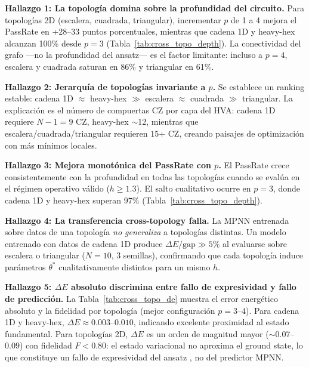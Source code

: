 \documentclass[11pt,a4paper,spanish]{book}
\begin{document}
\textbf{Hallazgo 1: La topología domina sobre la profundidad del circuito.} Para topologías 2D (escalera, cuadrada, triangular), incrementar $p$ de 1 a 4 mejora el PassRate en +28--33 puntos porcentuales, mientras que cadena 1D y heavy-hex alcanzan 100\% desde $p=3$ (Tabla~\ref{tab:cross_topo_depth}). La conectividad del grafo ---no la profundidad del ansatz--- es el factor limitante: incluso a $p=4$, escalera y cuadrada saturan en 86\% y triangular en 61\%.

\textbf{Hallazgo 2: Jerarquía de topologías invariante a $p$.} Se establece un ranking estable: cadena 1D $\approx$ heavy-hex $\gg$ escalera $\approx$ cuadrada $\gg$ triangular. La explicación es el número de compuertas CZ por capa del HVA: cadena 1D requiere $N-1 = 9$ CZ, heavy-hex $\sim$12, mientras que escalera/cuadrada/triangular requieren $15$+ CZ, creando paisajes de optimización con más mínimos locales.

\textbf{Hallazgo 3: Mejora monotónica del PassRate con $p$.} El PassRate crece consistentemente con la profundidad en todas las topologías cuando se evalúa en el régimen operativo válido ($h \geq 1.3$). El salto cualitativo ocurre en $p=3$, donde cadena 1D y heavy-hex superan 97\% (Tabla~\ref{tab:cross_topo_depth}).

\textbf{Hallazgo 4: La transferencia cross-topology falla.} La MPNN entrenada sobre datos de una topología \emph{no generaliza} a topologías distintas. Un modelo entrenado con datos de cadena 1D produce $\Delta E/\text{gap} \gg 5\%$ al evaluarse sobre escalera o triangular ($N = 10$, 3 semillas), confirmando que cada topología induce parámetros $\theta^*$ cualitativamente distintos para un mismo $h$.

\textbf{Hallazgo 5: $\Delta E$ absoluto discrimina entre fallo de expresividad y fallo de predicción.} La Tabla~\ref{tab:cross_topo_de} muestra el error energético absoluto y la fidelidad por topología (mejor configuración $p=3$--$4$). Para cadena 1D y heavy-hex, $\Delta E \approx 0.003$--$0.010$, indicando excelente proximidad al estado fundamental. Para topologías 2D, $\Delta E$ es un orden de magnitud mayor ($\sim$0.07--0.09) con fidelidad $F < 0.80$: el estado variacional no aproxima el ground state, lo que constituye un fallo de expresividad del ansatz \citep{tripathi2026}, no del predictor MPNN.
\end{document}
